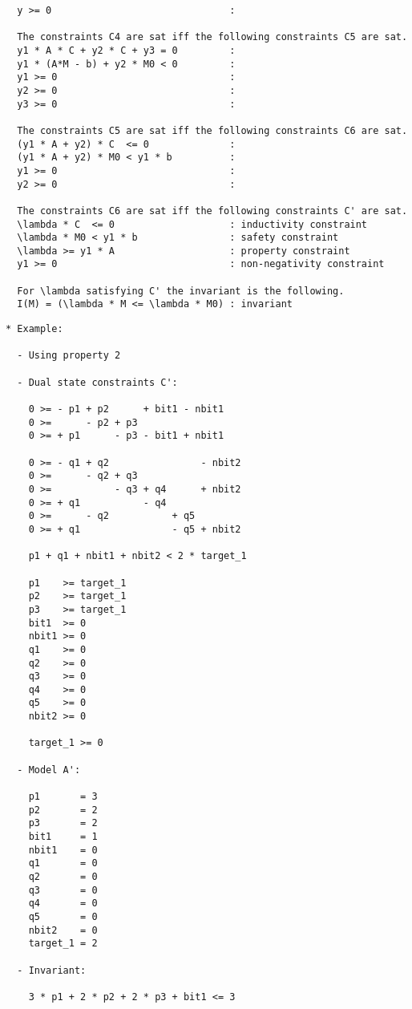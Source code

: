 \begin{verbatim}
  y >= 0                               : 

  The constraints C4 are sat iff the following constraints C5 are sat.
  y1 * A * C + y2 * C + y3 = 0         : 
  y1 * (A*M - b) + y2 * M0 < 0         : 
  y1 >= 0                              : 
  y2 >= 0                              : 
  y3 >= 0                              : 

  The constraints C5 are sat iff the following constraints C6 are sat.
  (y1 * A + y2) * C  <= 0              : 
  (y1 * A + y2) * M0 < y1 * b          : 
  y1 >= 0                              : 
  y2 >= 0                              : 

  The constraints C6 are sat iff the following constraints C' are sat.
  \lambda * C  <= 0                    : inductivity constraint
  \lambda * M0 < y1 * b                : safety constraint
  \lambda >= y1 * A                    : property constraint
  y1 >= 0                              : non-negativity constraint

  For \lambda satisfying C' the invariant is the following.
  I(M) = (\lambda * M <= \lambda * M0) : invariant
\end{verbatim}

\newpage

\begin{verbatim}
* Example:
  
  - Using property 2

  - Dual state constraints C':

    0 >= - p1 + p2      + bit1 - nbit1
    0 >=      - p2 + p3
    0 >= + p1      - p3 - bit1 + nbit1

    0 >= - q1 + q2                - nbit2
    0 >=      - q2 + q3
    0 >=           - q3 + q4      + nbit2
    0 >= + q1           - q4
    0 >=      - q2           + q5
    0 >= + q1                - q5 + nbit2

    p1 + q1 + nbit1 + nbit2 < 2 * target_1

    p1    >= target_1
    p2    >= target_1
    p3    >= target_1
    bit1  >= 0
    nbit1 >= 0
    q1    >= 0
    q2    >= 0
    q3    >= 0
    q4    >= 0
    q5    >= 0
    nbit2 >= 0

    target_1 >= 0

  - Model A':

    p1       = 3
    p2       = 2
    p3       = 2
    bit1     = 1
    nbit1    = 0
    q1       = 0
    q2       = 0
    q3       = 0
    q4       = 0
    q5       = 0
    nbit2    = 0
    target_1 = 2
    
  - Invariant:

    3 * p1 + 2 * p2 + 2 * p3 + bit1 <= 3

\end{verbatim}


